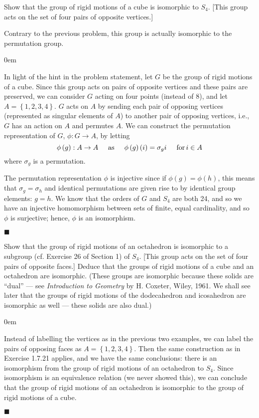 \documentclass[12pt]{article}
\renewcommand{\qed}{\hfill$\blacksquare$}
\renewenvironment{proof}{\begin{addmargin}[1em]{0em}\begin{newproof}}{\end{newproof}\end{addmargin}\qed}
\newenvironment{problem}[2][Exercise]{\begin{trivlist}
\item[\hskip \labelsep {\bfseries #1}\hskip \labelsep {\bfseries #2.}]}{\end{trivlist}}
\begin{document}
\begin{problem}{1.7.21}
Show that the group of rigid motions of a cube is isomorphic to $S_4$. [This group acts on the set of four pairs of opposite vertices.]
\end{problem}
{\color{red}Contrary to the previous problem, this group is actually isomorphic to the permutation group.}\\
\begin{proof}
In light of the hint in the problem statement, let $G$ be the group of rigid motions of a cube. Since this group acts on pairs of opposite vertices and these pairs are preserved, we can consider $G$ acting on four points (instead of 8), and let $A=\left\{1,2,3,4\right\}$. $G$ acts on $A$ by sending each pair of opposing vertices (represented as singular elements of $A$) to another pair of opposing vertices, i.e., $G$ has an action on $A$ and permutes $A$. We can construct the permutation representation of $G$, $\phi:G\rightarrow A$, by letting $$ \phi\left(g\right): A\rightarrow A \hspace{5mm} \text{as} \hspace{5mm} \phi\left(g\right)\left(i\right) = \sigma_g i \hspace{5mm} \text{for} \, i\in A $$ where $\sigma_g$ is a permutation.

The permutation representation $\phi$ is injective since if $\phi\left(g\right)=\phi\left(h\right)$, this means that $\sigma_g=\sigma_h$ and identical permutations are given rise to by identical group elements: $g=h$. We know that the orders of $G$ and $S_4$ are both 24, and so we have an injective homomorphism between sets of finite, equal cardinality, and so $\phi$ is surjective; hence, $\phi$ is an isomorphism.
\end{proof}


\begin{problem}{1.7.22}
Show that the group of rigid motions of an octahedron is isomorphic to a subgroup (cf. Exercise 26 of Section 1) of $S_4$. [This group acts on the set of four pairs of opposite faces.] Deduce that the groups of rigid motions of a cube and an octahedron are isomorphic. (These groups are isomorphic because these solids are ``dual'' --- see \textit{Introduction to Geometry} by H. Coxeter, Wiley, 1961. We shall see later that the groups of rigid motions of the dodecahedron and icosahedron are isomorphic as well --- these solids are also dual.)
\end{problem}
\begin{proof}
Instead of labelling the vertices as in the previous two examples, we can label the pairs of opposing faces as $A=\left\{1,2,3,4\right\}$. Then the same construction as in Exercise 1.7.21 applies, and we have the same conclusions: there is an isomorphism from the group of rigid motions of an octahedron to $S_4$. Since isomorphism is an equivalence relation (we never showed this), we can conclude that the group of rigid motions of an octahedron is isomorphic to the group of rigid motions of a cube.
\end{proof}
\end{document}
